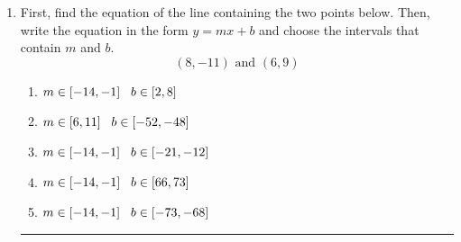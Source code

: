 \documentclass[14pt]{extbook}
\newcommand{\litem}[1]{\item#1\hspace*{-1cm}\rule{\textwidth}{0.4pt}}
\begin{document}
\begin{enumerate}
{\begin{enumerate}[label=\Alph*.]
\end{enumerate} }
\litem{
First, find the equation of the line containing the two points below. Then, write the equation in the form $ y=mx+b $ and choose the intervals that contain $m$ and $b$.\[ (8, -11) \text{ and } (6, 9) \]\begin{enumerate}[label=\Alph*.]
\item \( m \in [-14, -1] \hspace*{3mm} b \in [2, 8] \)
\item \( m \in [6, 11] \hspace*{3mm} b \in [-52, -48] \)
\item \( m \in [-14, -1] \hspace*{3mm} b \in [-21, -12] \)
\item \( m \in [-14, -1] \hspace*{3mm} b \in [66, 73] \)
\item \( m \in [-14, -1] \hspace*{3mm} b \in [-73, -68] \)

\end{enumerate} }
\end{enumerate}
\end{document}
